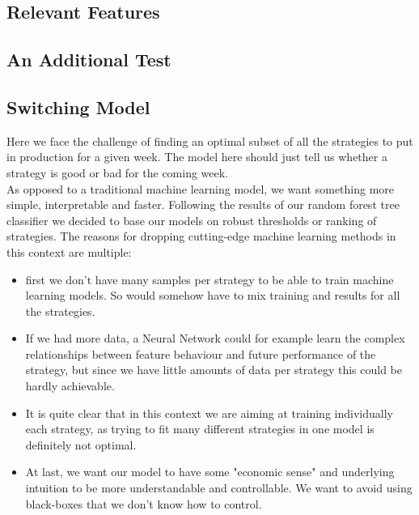 \documentclass[12pt]{article} %
\numberwithin{equation}{subsection}
\begin{document}



\subsection{Relevant Features}




\subsection{An Additional Test}



\subsection{Switching Model}

Here we face the challenge of finding an optimal subset of all the strategies to put in production for a given week. The model here should just tell us whether a strategy is good or bad for the coming week.\\
As opposed to a traditional machine learning model, we want something more simple, interpretable and faster. Following the results of our random forest tree classifier we decided to base our models on robust thresholds or ranking of strategies. The reasons for dropping cutting-edge machine learning methods in this context are multiple:

\begin{itemize}
	\item first we don't have many samples per strategy to be able to train machine learning models. So would somehow have to mix training and results for all the strategies.
	\item If we had more data, a Neural Network could for example learn the complex relationships between feature behaviour and future performance of the strategy, but since we have little amounts of data per strategy this could be hardly achievable.
	\item It is quite clear that in this context we are aiming at training individually each strategy, as trying to fit many different strategies in one model is definitely not optimal.
	\item At last, we want our model to have some "economic sense" and underlying intuition to be more understandable and controllable. We want to avoid using black-boxes that we don't know how to control.
\end{itemize} 
  
\end{document}
